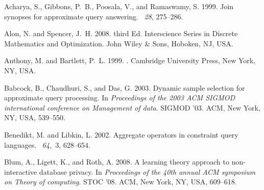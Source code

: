 

%
%

\iffalse
\begin{thebibliography}{}

{\sc Acharya, S.}, {\sc Gibbons, P.~B.}, {\sc Poosala, V.}, {\sc and} {\sc
  Ramaswamy, S.} 1999.
\newblock Join synopses for approximate query answering.
~{\em 28}, 275--286.

{\sc Alon, N.} {\sc and} {\sc Spencer, J.~H.} 2008.
 third Ed.
\newblock Interscience Series in Discrete Mathematics and Optimization. John
  Wiley {\&} Sons, Hoboken, NJ, USA.

{\sc Anthony, M.} {\sc and} {\sc Bartlett, P.~L.} 1999.
.
\newblock Cambridge University Press, New York, NY, USA.

{\sc Babcock, B.}, {\sc Chaudhuri, S.}, {\sc and} {\sc Das, G.} 2003.
\newblock Dynamic sample selection for approximate query processing.
\newblock In {\em Proceedings of the 2003 ACM SIGMOD international conference
  on Management of data}. SIGMOD '03. ACM, New York, NY, USA, 539--550.

{\sc Benedikt, M.} {\sc and} {\sc Libkin, L.} 2002.
\newblock Aggregate operators in constraint query languages.
~{\em 64,\/}~3,
  628--654.

{\sc Blum, A.}, {\sc Ligett, K.}, {\sc and} {\sc Roth, A.} 2008.
\newblock A learning theory approach to non-interactive database privacy.
\newblock In {\em Proceedings of the 40th annual ACM symposium on Theory of
  computing}. STOC '08. ACM, New York, NY, USA, 609--618.


\end{thebibliography}
